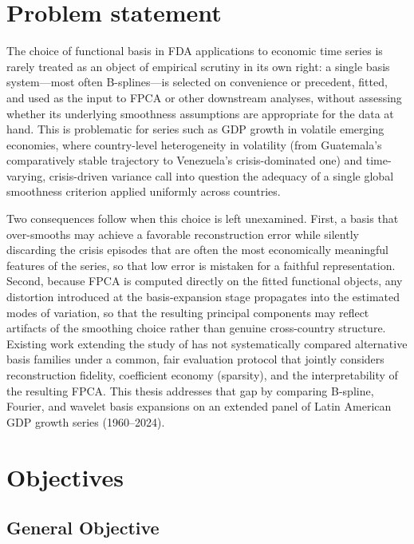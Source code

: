 \section{Problem statement}
\label{sec:problem_statement}

The choice of functional basis in FDA applications to economic time
series is rarely treated as an object of empirical scrutiny in its own
right: a single basis system---most often B-splines---is selected on
convenience or precedent, fitted, and used as the input to FPCA or other
downstream analyses, without assessing whether its underlying smoothness
assumptions are appropriate for the data at hand. This is problematic for
series such as GDP growth in volatile emerging economies, where
country-level heterogeneity in volatility (from Guatemala's comparatively
stable trajectory to Venezuela's crisis-dominated one) and time-varying,
crisis-driven variance call into question the adequacy of a single global
smoothness criterion applied uniformly across countries.

Two consequences follow when this choice is left unexamined. First, a
basis that over-smooths may achieve a favorable reconstruction error while
silently discarding the crisis episodes that are often the most
economically meaningful features of the series, so that low error is
mistaken for a faithful representation. Second, because FPCA is computed
directly on the fitted functional objects, any distortion introduced at
the basis-expansion stage propagates into the estimated modes of
variation, so that the resulting principal components may reflect
artifacts of the smoothing choice rather than genuine cross-country
structure. Existing work extending the study of \cite{padilla2020} has not
systematically compared alternative basis families under a common,
fair evaluation protocol that jointly considers reconstruction fidelity,
coefficient economy (sparsity), and the interpretability of the resulting
FPCA. This thesis addresses that gap by comparing B-spline, Fourier, and
wavelet basis expansions on an extended panel of Latin American GDP growth
series (1960--2024).

\section{Objectives}
\label{sec:objectives}

\subsection{General Objective}

